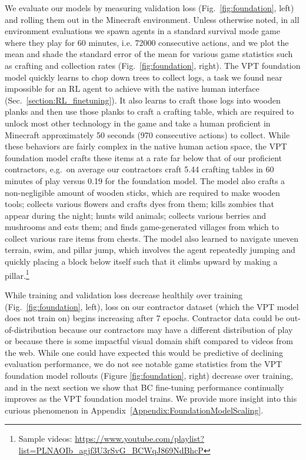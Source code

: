We evaluate our models by measuring validation loss (Fig.~\ref{fig:foundation}, left) and rolling them out in the Minecraft environment. Unless otherwise noted, in all environment evaluations we spawn agents in a standard survival mode game where they play for 60 minutes, i.e. 72000 consecutive actions, and we plot the mean and shade the standard error of the mean for various game statistics such as crafting and collection rates (Fig.~\ref{fig:foundation}, right).
The VPT foundation model quickly learns to chop down trees to collect logs, a task we found near impossible for an RL agent to achieve with the native human interface (Sec.~\ref{section:RL_finetuning}).
It also learns to craft those logs into wooden planks and then use those planks to craft a crafting table, which are required to unlock most other technology in the game and take a human proficient in Minecraft approximately 50 seconds (970 consecutive actions) to collect.
While these behaviors are fairly complex in the native human action space, the VPT foundation model crafts these items at a rate far below that of our proficient contractors, e.g.\ on average our contractors craft 5.44 crafting tables in 60 minutes of play versus 0.19 for the foundation model.
The model also crafts a non-negligible amount of wooden sticks, which are required to make wooden tools; collects various flowers and crafts dyes from them; kills zombies that appear during the night; hunts wild animals; collects various berries and mushrooms and eats them; and finds game-generated villages from which to collect various rare items from chests. The model also learned to navigate uneven terrain, swim, and pillar jump, which involves the agent repeatedly jumping and quickly placing a block below itself such that it climbs upward by making a pillar.\footnote{Sample videos: \href{https://www.youtube.com/playlist?list=PLNAOIb\_agjf3U3rSvG\_BCWqJ869NdBhcP}{https://www.youtube.com/playlist?list=PLNAOIb\_agjf3U3rSvG\_BCWqJ869NdBhcP}}

While training and validation loss decrease healthily over training (Fig.~\ref{fig:foundation}, left), loss on our contractor dataset (which the VPT model does not train on) begins increasing after 7 epochs.
Contractor data could be out-of-distribution because our contractors may have a different distribution of play or because there is some impactful visual domain shift compared to videos from the web.
While one could have expected this would be predictive of declining evaluation performance, we do not see notable game statistics from the VPT foundation model rollouts (Figure \ref{fig:foundation}, right) decrease over training, and in the next section we show that BC fine-tuning performance continually improves as the VPT foundation model trains.
We provide more insight into this curious phenomenon in Appendix~\ref{Appendix:FoundationModelScaling}.
